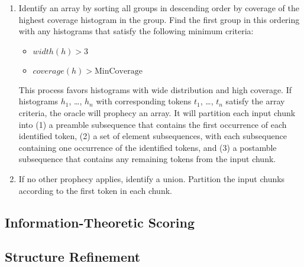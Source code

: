 \begin {enumerate}
\item Identify an array by sorting all groups in descending 
order by coverage of the highest coverage histogram in the group.
Find the first group in this ordering with any histograms that satisfy
the following minimum criteria:
\begin {itemize}
\item $\mathit{width}(h) > 3$
\item $\mathit{coverage}(h) > \mathrm{MinCoverage}$
\end{itemize}
This process favors histograms with wide distribution and high coverage.
If histograms $h_1$, \ldots, $h_n$ with corresponding tokens 
$t_1$, \ldots, $t_n$ satisfy the array criteria, the oracle will
prophecy an array.   It will 
partition each input chunk into (1) a preamble subsequence 
that contains the first occurrence of each identified token, 
(2) a set of element subsequences, with each subsequence containing
one occurrence of the identified tokens, and
(3) a postamble subsequence that contains any remaining tokens from
the input chunk.

\item If no other prophecy applies, identify a union. Partition
  the input chunks according to the first token in each chunk. 
\end{enumerate}


\subsection {Information-Theoretic Scoring}
\label{sec:score}



\subsection {Structure Refinement}

%


